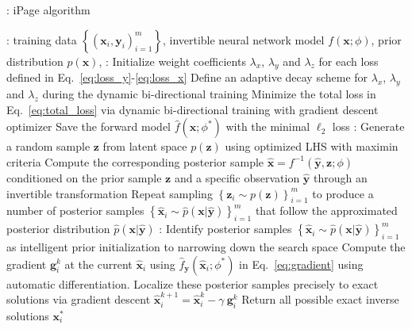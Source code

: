 \documentclass[letterpaper]{article} %
\begin{document}
\begin{algorithm}[h!]\label{algo:1}
\footnotesize
  \caption{\hspace{-0.1cm}: iPage algorithm}
\begin{algorithmic}[1]
: training data $\left\{(\mathbf{x}_i, \mathbf{y}_i)_{i=1}^m \right\}$, invertible neural network model $f(\mathbf{x};\phi)$, prior distribution $p(\mathbf{x})$,  
\vspace{0.1cm}
:
\vspace{0.1cm}
\STATE Initialize weight coefficients $\lambda_x$, $\lambda_y$ and $\lambda_z$  for each loss defined in Eq.~\eqref{eq:loss_y}-\eqref{eq:loss_x}  
\STATE Define an adaptive decay scheme for $\lambda_x$, $\lambda_y$ and $\lambda_z$ during the dynamic bi-directional training 
\STATE Minimize the total loss in Eq.~\eqref{eq:total_loss} via dynamic bi-directional training with gradient descent optimizer
\STATE Save the forward model $\hat{f}(\mathbf{x}; \phi^*)$ with the minimal $\ell_2$ loss 
\vspace{0.1cm}
:
\vspace{0.1cm}
\STATE Generate a random sample $\mathbf{z}$ from latent space $p(\mathbf z)$ using optimized LHS with maximin criteria 
\STATE Compute the corresponding posterior sample $\hat{\mathbf{x}} = f^{-1}(\hat{\mathbf{y}}, \mathbf{z}; \phi)$ conditioned on the prior sample $\mathbf z$ and a specific observation $\hat{\mathbf{y}}$ through an invertible transformation 
\STATE Repeat sampling $\left\{\mathbf{z}_i \sim p(\mathbf{z}) \right\}_{i=1}^m$ to produce a number of posterior samples $\left\{\hat{\mathbf{x}}_i \sim \hat{p}({\mathbf{x}} | \hat{\mathbf{y}}) \right\}_{i=1}^m$ that follow the approximated posterior distribution $\hat{p}(\mathbf{x} | \hat{\mathbf{y}})$
\vspace{0.1cm}
: 
\vspace{0.1cm}
\STATE Identify posterior samples $\left\{\hat{\mathbf{x}}_i \sim \hat{p}({\mathbf{x}} | \hat{\mathbf{y}}) \right\}_{i=1}^m$ as intelligent prior initialization to narrowing down the search space 
\STATE Compute the gradient $\mathbf{g}_i^{k}$ at the current $\hat{\mathbf{x}}_i$ using $\hat{f}_{\mathbf{y}}(\hat{\mathbf{x}}_i;{\phi}^*)$ in Eq.~\eqref{eq:gradient} using automatic differentiation. 
\STATE Localize these posterior samples precisely to exact solutions via gradient descent $\hat{\mathbf{x}}_{i}^{k+1} = \hat{\mathbf{x}}_i^{k} -\gamma ~ \mathbf{g}_i^{k}$
\STATE Return all possible exact inverse solutions $\mathbf{x}_i^{*}$
\end{algorithmic}
\end{algorithm}
\end{document}
